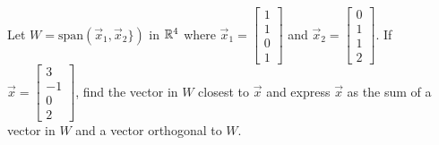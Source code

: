 \documentclass{ximera}
\begin{document}
\begin{example}\label{023908}
Let $W = \mbox{span}\left(\vec{x}_{1}, \vec{x}_{2}\}\right)$ in $\mathbb{R}^4$ where $\vec{x}_{1} = \begin{bmatrix}
1 \\ 1 \\ 0 \\ 1
\end{bmatrix}$ and $\vec{x}_{2} = \begin{bmatrix}
0 \\ 1 \\ 1 \\ 2
\end{bmatrix}$. If $\vec{x} = \begin{bmatrix}
3 \\ -1 \\ 0 \\ 2
\end{bmatrix}$, find the vector in $W$ closest to $\vec{x}$ and express $\vec{x}$ as the sum of a vector in $W$ and a vector orthogonal to $W$.


\end{example}
\end{document}
